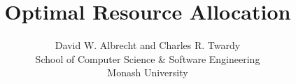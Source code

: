 \documentclass{article}
\title{Optimal Resource Allocation}
\author{David W. Albrecht and Charles R. Twardy\\
  School of Computer Science \& Software Engineering\\
  Monash University
}
\begin{document}
\maketitle{}

% 
%



\end{document}
